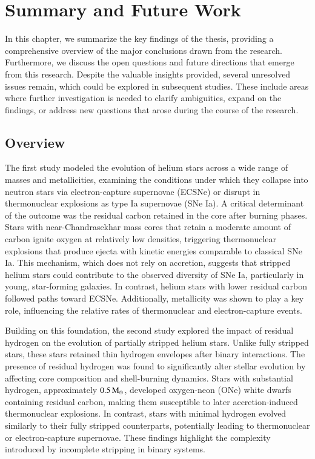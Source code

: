 \documentclass[main.tex]{subfiles}
\begin{document}
    \chapter[Summary and Future Work]{Summary and Future Work}
    In this chapter, we summarize the key findings of the thesis, providing a comprehensive overview of the major conclusions drawn from the research. Furthermore, we discuss the open questions and future directions that emerge from this research. Despite the valuable insights provided, several unresolved issues remain, which could be explored in subsequent studies. These include areas where further investigation is needed to clarify ambiguities, expand on the findings, or address new questions that arose during the course of the research.

    {
        \minitoc
        \newpage
    }
    
    \section{Overview} \label{sec:ch5:overview}
    The first study modeled the evolution of helium stars across a wide range of masses and metallicities, examining the conditions under which they collapse into neutron stars via electron-capture supernovae (ECSNe) or disrupt in thermonuclear explosions as type Ia supernovae (SNe Ia). A critical determinant of the outcome was the residual carbon retained in the core after burning phases. Stars with near-Chandrasekhar mass cores that retain a moderate amount of carbon ignite oxygen at relatively low densities, triggering thermonuclear explosions that produce ejecta with kinetic energies comparable to classical SNe Ia. This mechanism, which does not rely on accretion, suggests that stripped helium stars could contribute to the observed diversity of SNe Ia, particularly in young, star-forming galaxies. In contrast, helium stars with lower residual carbon followed paths toward ECSNe. Additionally, metallicity was shown to play a key role, influencing the relative rates of thermonuclear and electron-capture events.

    Building on this foundation, the second study explored the impact of residual hydrogen on the evolution of partially stripped helium stars. Unlike fully stripped stars, these stars retained thin hydrogen envelopes after binary interactions. The presence of residual hydrogen was found to significantly alter stellar evolution by affecting core composition and shell-burning dynamics. Stars with substantial hydrogen, approximately $0.5\mathrm{\,M_\odot}$, developed oxygen-neon (ONe) white dwarfs containing residual carbon, making them susceptible to later accretion-induced thermonuclear explosions. In contrast, stars with minimal hydrogen evolved similarly to their fully stripped counterparts, potentially leading to thermonuclear or electron-capture supernovae. These findings highlight the complexity introduced by incomplete stripping in binary systems.
\end{document}
